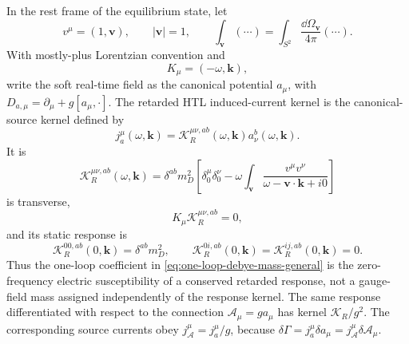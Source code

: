 \begin{lemma}
\label{lem:thermal-screening-htl-static-limit}
In the rest frame of the equilibrium state, let
\[
  v^\mu=(1,\mathbf v),\qquad |\mathbf v|=1,\qquad
  \int_{\mathbf v}(\cdots)
  =
  \int_{S^2}\frac{\dd\Omega_{\mathbf v}}{4\pi}(\cdots).
\]
With mostly-plus Lorentzian convention and
\[
  K_\mu=(-\omega,\mathbf k),
\]
write the soft real-time field as the canonical potential \(a_\mu\), with
\(D_{a,\mu}=\partial_\mu+g[a_\mu,\cdot]\).  The retarded HTL
induced-current kernel is the canonical-source kernel defined by
\[
  j_a^\mu(\omega,\mathbf k)
  =
  \mathcal K_R^{\mu\nu,ab}(\omega,\mathbf k)
  a_\nu^b(\omega,\mathbf k).
\]
It is
\begin{equation}
  \mathcal K_R^{\mu\nu,ab}(\omega,\mathbf k)
  =
  \delta^{ab}m_D^2
  \left[
    \delta^\mu_0\delta^\nu_0
    -
    \omega\int_{\mathbf v}
    \frac{v^\mu v^\nu}
    {\omega-\mathbf v\cdot\mathbf k+i0}
  \right]
  \label{eq:thermal-screening-retarded-htl-kernel}
\end{equation}
is transverse,
\[
  K_\mu\mathcal K_R^{\mu\nu,ab}=0,
\]
and its static response is
\[
  \mathcal K_R^{00,ab}(0,\mathbf k)=\delta^{ab}m_D^2,\qquad
  \mathcal K_R^{0i,ab}(0,\mathbf k)
  =
  \mathcal K_R^{ij,ab}(0,\mathbf k)=0 .
\]
Thus the one-loop coefficient in
\eqref{eq:one-loop-debye-mass-general} is the zero-frequency electric
susceptibility of a conserved retarded response, not a gauge-field mass
assigned independently of the response kernel.
The same response differentiated with respect to the connection
\(\mathcal A_\mu=ga_\mu\) has kernel \(\mathcal K_R/g^2\).  The corresponding
source currents obey \(j_{\mathcal A}^\mu=j_a^\mu/g\), because
\(\delta\Gamma=j_a^\mu\delta a_\mu
=j_{\mathcal A}^\mu\delta\mathcal A_\mu\).
\end{lemma}


